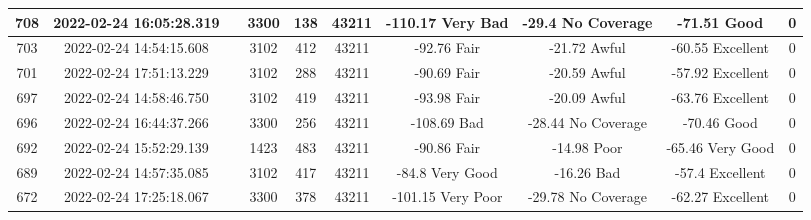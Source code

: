 \begin{longtable*}{|c|c|c|c|c|c|c|c|c|c|}
708&2022-02-24 16:05:28.319&&3300&138&43211& -110.17   Very Bad    & -29.4     No Coverage & -71.51    Good        & 0\\\hline
{}703&2022-02-24 14:54:15.608&&3102&412&43211& -92.76    Fair        & -21.72    Awful       & -60.55    Excellent   & 0\\\hline
{}701&2022-02-24 17:51:13.229&&3102&288&43211& -90.69    Fair        & -20.59    Awful       & -57.92    Excellent   & 0\\\hline
{}697&2022-02-24 14:58:46.750&&3102&419&43211& -93.98    Fair        & -20.09    Awful       & -63.76    Excellent   & 0\\\hline
{}696&2022-02-24 16:44:37.266&&3300&256&43211& -108.69   Bad         & -28.44    No Coverage & -70.46    Good        & 0\\\hline
{}692&2022-02-24 15:52:29.139&&1423&483&43211& -90.86    Fair        & -14.98    Poor        & -65.46    Very Good   & 0\\\hline
{}689&2022-02-24 14:57:35.085&&3102&417&43211& -84.8     Very Good   & -16.26    Bad         & -57.4     Excellent   & 0\\\hline
{}672&2022-02-24 17:25:18.067&&3300&378&43211& -101.15   Very Poor   & -29.78    No Coverage & -62.27    Excellent   & 0\\\hline

\end{longtable*}
